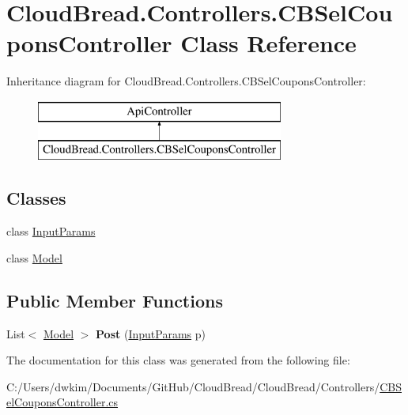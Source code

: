 \hypertarget{a00045}{}\section{Cloud\+Bread.\+Controllers.\+C\+B\+Sel\+Coupons\+Controller Class Reference}
\label{a00045}
Inheritance diagram for Cloud\+Bread.\+Controllers.\+C\+B\+Sel\+Coupons\+Controller\+:\begin{figure}[H]
\begin{center}
\leavevmode
\includegraphics[height=2.000000cm]{a00045}
\end{center}
\end{figure}
\subsection*{Classes}
\begin{DoxyCompactItemize}
\item 
class \hyperlink{a00120}{Input\+Params}
\item 
class \hyperlink{a00162}{Model}
\end{DoxyCompactItemize}
\subsection*{Public Member Functions}
\begin{DoxyCompactItemize}
\item 
List$<$ \hyperlink{a00162}{Model} $>$ {\bfseries Post} (\hyperlink{a00120}{Input\+Params} p)\hypertarget{a00045_a3de4395ed278d0b0de328f87d4641297}{}\label{a00045_a3de4395ed278d0b0de328f87d4641297}

\end{DoxyCompactItemize}


The documentation for this class was generated from the following file\+:\begin{DoxyCompactItemize}
\item 
C\+:/\+Users/dwkim/\+Documents/\+Git\+Hub/\+Cloud\+Bread/\+Cloud\+Bread/\+Controllers/\hyperlink{a00216}{C\+B\+Sel\+Coupons\+Controller.\+cs}\end{DoxyCompactItemize}

